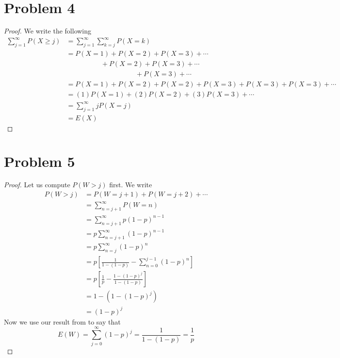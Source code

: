 \documentclass{article}
\begin{document}
\section*{Problem 4}
    \begin{proof}
        We write the following
        \begin{align*}
            \sum_{j=1}^\infty P(X\geqslant j)&=\sum_{j=1}^\infty \sum_{k=j}^\infty P(X = k)\\
            &=P(X = 1) + P(X = 2) + P(X = 3) + \cdots\\
            & \ \ \ \ \ \ \ \ \ \ \ \ \ \ \ \ \ \ \ \ \ \ \ + P(X = 2) + P(X = 3) + \cdots \\
            & \ \ \ \ \ \ \ \ \ \ \ \ \ \ \ \ \ \ \ \ \ \ \ \ \ \ \ \ \ \ \ \ \ \ \ \ \ \ \ \ \ \ \ \ \ \ + P(X = 3) + \cdots \\
            &=P(X = 1) + P(X = 2) + P(X = 2) + P(X = 3) + P(X = 3) + P(X = 3) + \cdots\\
            &=(1)P(X=1)+(2)P(X=2)+(3)P(X=3) + \cdots\\
            &=\sum_{j=1}^\infty j P(X=j)\\
            &=E(X)
        \end{align*}
    \end{proof}
\section*{Problem 5}
    \begin{proof}
        Let us compute $P(W > j)$ first.
        We write
        \begin{align*}
            P(W>j)&=P(W=j+1)+P(W=j+2)+\cdots\\
            &=\sum_{n=j+1}^\infty P(W=n)\\
            &=\sum_{n=j+1}^\infty p(1-p)^{n-1}\\
            &=p\sum_{n=j+1}^\infty (1-p)^{n-1}\\
            &=p\sum_{n=j}^\infty(1-p)^n\\
            &=p\left[\frac{1}{1-(1-p)}-\sum_{n=0}^{j-1}(1-p)^n\right]\\
            &=p\left[\frac{1}{p} - \frac{1-(1-p)^j}{1-(1-p)}\right]\\
            &=1- (1-(1-p)^j)\\
            &=(1-p)^j
        \end{align*}
        Now we use our result from  to say that
        \[ E(W) = \sum_{j=0}^\infty (1-p)^j = \frac{1}{1-(1-p)} = \frac{1}{p} \]
    \end{proof}
\end{document}
